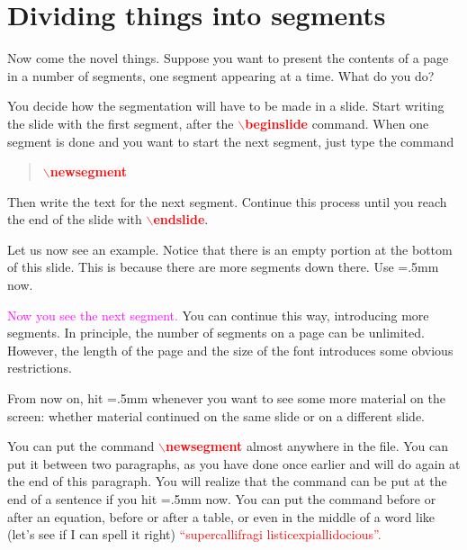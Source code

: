 \documentclass[12pt]{article}
\def\comm#1{{\textcolor{red}{$\backslash${\bf #1}}}}
\def\button#1{{\fboxrule=.5mm\framebox{#1}}}
\begin{document}
\endslide



\beginslide
\section{Dividing things into segments}
%
Now come the novel things.  Suppose you want to present the contents
of a page in a number of segments, one segment appearing at a time.
What do you do?

You decide how the segmentation will have to be made in a slide.  
Start writing the slide with the first segment, after the
\comm{beginslide} command.  When one segment is
done and you want to start the next segment, just type the command
%
\begin{quote}
\comm{newsegment}
\end{quote}
%
Then write the text for the next segment.  Continue this process until
you reach the end of the slide with \comm{endslide}.

Let us now see an example.  Notice that there is an empty portion at
the bottom of this slide.  This is because there are more segments
down there.  Use \button{$\bullet$} now.

\newsegment

\textcolor{magenta}{Now you see the next segment.}  You can continue this
way, introducing more segments.  In principle, the number of segments
on a page can be unlimited.  However, the length of the page and the
size of the font introduces some obvious restrictions.

From now on, hit \button{$\bullet$} whenever you want to see some more
material on the screen: whether material continued on the same slide
or on a different slide.

\endslide


\beginslide

You can put the command \comm{newsegment} almost anywhere in the file.
You can put it between two paragraphs, as you have done once earlier
and will do again at the end of this paragraph.  You will realize that
the command can be put at the end of a sentence if you hit
\button{$\bullet$} now. \newsegment You can put the command before or
after an equation, before or after a table, or even in the middle of a
word like (let's see if I can spell it right) \textcolor{red}{ \Huge
``super\-\newsegment calli\newsegment fragi\newsegment
listic\newsegment expi\newsegment alli\newsegment docious''.}
\end{document}
